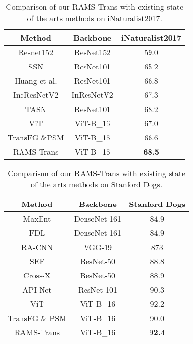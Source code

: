 \documentclass[sigconf]{acmart}
\begin{document}
\begin{table}[t]
\caption{Comparison of our RAMS-Trans with existing state of the arts methods on iNaturalist2017.}
\centering
\begin{tabular}{c|c|c}
\hline
Method
&Backbone
&iNaturalist2017
\\
\hline
Resnet152 \cite{ResNet}
&ResNet152
&59.0
\\
SSN \cite{SSN}
&ResNet101
&65.2

\\
Huang et al. \cite{Interpretable}
&ResNet101
&66.8

\\
IncResNetV2 \cite{Inception-v4}
&InResNetV2
&67.3

\\
TASN \cite{TASN}
&ResNet101
&68.2

\\
\hline

ViT \cite{ViT}
&ViT-B\_16
&67.0

\\
TransFG \&PSM \cite{TransFG}
&ViT-B\_16
&66.6
\\
RAMS-Trans
&ViT-B\_16
&\textbf{68.5}

\\
\hline
\end{tabular}
\label{tab_acc_size}
\end{table}

\begin{table}[t]
\caption{Comparison of our RAMS-Trans with existing state of the arts methods on Stanford Dogs.}
\centering
\begin{tabular}{c|c|c}
\hline
Method
&Backbone
&Stanford Dogs
\\
\hline
MaxEnt \cite{MaxEnt}
&DenseNet-161
&84.9
\\
FDL \cite{FDL}
&DenseNet-161
&84.9

\\
RA-CNN \cite{RA-CNN}
&VGG-19
&873

\\
SEF \cite{SEF}
&ResNet-50
&88.8

\\
Cross-X \cite{Cross-X}
&ResNet-50
&88.9
\\
API-Net \cite{API-Net}
&ResNet-101
&90.3

\\
\hline

ViT \cite{ViT}
&ViT-B\_16
&92.2

\\
TransFG \& PSM \cite{TransFG}
&ViT-B\_16
&90.0

\\
RAMS-Trans
&ViT-B\_16
&\textbf{92.4}

\\
\hline
\end{tabular}
\label{tab_acc_size}
\end{table}
\end{document}
